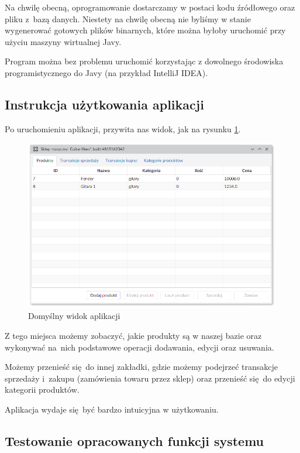 Na chwilę obecną, oprogramowanie dostarczamy w postaci kodu źródłowego oraz pliku z~bazą danych. Niestety na chwilę obecną nie byliśmy w stanie wygenerować gotowych plików binarnych, które można byłoby uruchomić przy użyciu maszyny wirtualnej Javy.

Program można bez problemu uruchomić korzystając z dowolnego środowiska programistycznego do Javy (na przykład IntelliJ IDEA).

\subsection{Instrukcja użytkowania aplikacji}

Po uruchomieniu aplikacji, przywita nas widok, jak na rysunku \ref{image7}.

\begin{figure}[h]
	\centering
	\includegraphics[width=0.7\linewidth]{images/image7.png}
	\caption{Domyślny widok aplikacji}
	\label{image7}
\end{figure}

Z tego miejsca możemy zobaczyć, jakie produkty są w naszej bazie oraz wykonywać na~nich podstawowe operacji dodawania, edycji oraz usuwania.

Możemy przenieść się do innej zakładki, gdzie możemy podejrzeć transakcje sprzedaży i~zakupu (zamówienia towaru przez sklep) oraz przenieść się do edycji kategorii produktów.

Aplikacja wydaje się być bardzo intuicyjna w użytkowaniu.


\subsection{Testowanie opracowanych funkcji systemu}

